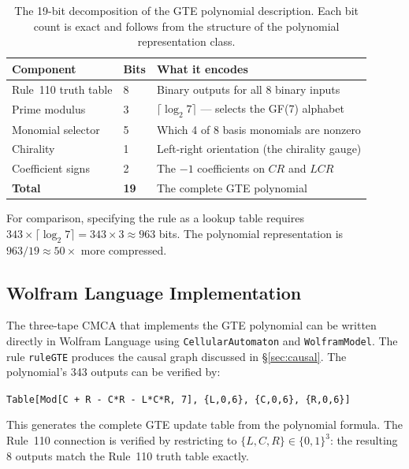 \documentclass[11pt,a4paper]{article}
\begin{document}
\begin{table}[htbp]
\centering
\caption{The 19-bit decomposition of the GTE polynomial description.
Each bit count is exact and follows from the structure of the polynomial
representation class.}
\label{tab:19bits}
\begin{tabular}{lll}
\toprule
Component & Bits & What it encodes \\
\midrule
Rule~110 truth table & 8 & Binary outputs for all 8 binary inputs \\
Prime modulus & 3 & $\lceil\log_2 7\rceil$ — selects the GF(7) alphabet \\
Monomial selector & 5 & Which 4 of 8 basis monomials are nonzero \\
Chirality & 1 & Left-right orientation (the chirality gauge) \\
Coefficient signs & 2 & The $-1$ coefficients on $CR$ and $LCR$ \\
\midrule
\textbf{Total} & \textbf{19} & The complete GTE polynomial \\
\bottomrule
\end{tabular}
\end{table}

For comparison, specifying the rule as a lookup table requires
$343 \times \lceil\log_2 7\rceil = 343 \times 3 \approx 963$ bits.
The polynomial representation is $963/19 \approx 50\times$ more compressed.

\subsection{Wolfram Language Implementation}

The three-tape CMCA that implements the GTE polynomial can be written directly
in Wolfram Language using \texttt{CellularAutomaton} and \texttt{WolframModel}.
The rule \texttt{ruleGTE} produces the causal graph discussed in
\S\ref{sec:causal}.  The polynomial's 343 outputs can be verified by:

\begin{center}
\texttt{Table[Mod[C + R - C*R - L*C*R, 7], \{L,0,6\}, \{C,0,6\}, \{R,0,6\}]}
\end{center}

This generates the complete GTE update table from the polynomial formula.  The
Rule~110 connection is verified by restricting to $\{L,C,R\} \in \{0,1\}^3$:
the resulting 8 outputs match the Rule~110 truth table exactly.

\end{document}

